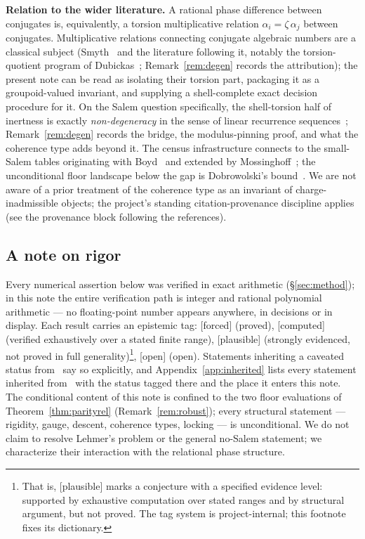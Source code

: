 \documentclass[11pt]{article}
\theoremstyle{plain}
\theoremstyle{definition}
\theoremstyle{remark}
\newcommand{\F}{\textnormal{[forced]}}
\newcommand{\C}{\textnormal{[computed]}}
\newcommand{\Pl}{\textnormal{[plausible]}}
\newcommand{\Op}{\textnormal{[open]}}
\begin{document}
\medskip
\noindent\textbf{Relation to the wider literature.} A rational phase
difference between conjugates is, equivalently, a torsion multiplicative
relation $\alpha_i=\zeta\,\alpha_j$ between conjugates. Multiplicative
relations connecting conjugate algebraic numbers are a classical subject
(Smyth~\cite{Smyth1986} and the literature following it, notably the
torsion-quotient program of Dubickas~\cite{Dub2012, Dub2017, Dub2021};
Remark~\ref{rem:degen} records the attribution); the present note
can be read as isolating their torsion part, packaging it as a
groupoid-valued invariant, and supplying a shell-complete exact decision
procedure for it. On the Salem question specifically, the shell-torsion
half of inertness is exactly \emph{non-degeneracy} in the sense of linear
recurrence sequences~\cite{EPSW}; Remark~\ref{rem:degen} records the
bridge, the modulus-pinning proof, and what the coherence type adds beyond
it. The census infrastructure connects to the small-Salem
tables originating with Boyd~\cite{Boyd1977} and extended by
Mossinghoff~\cite{Mossinghoff}; the unconditional floor landscape below the
gap is Dobrowolski's bound~\cite{Dobrowolski}. We are not aware of a prior
treatment of the coherence type as an invariant of charge-inadmissible
objects; the project's standing citation-provenance discipline applies (see
the provenance block following the references).

\subsection{A note on rigor}

Every numerical assertion below was verified in exact arithmetic
(\S\ref{sec:method}); in this note the entire verification path is integer and
rational polynomial arithmetic --- no floating-point number appears anywhere, in
decisions or in display. Each result carries an epistemic tag: \F{} (proved),
\C{} (verified exhaustively over a stated finite range), \Pl{} (strongly
evidenced, not proved in full generality)\footnote{That is, \Pl{} marks a
conjecture with a specified evidence level: supported by exhaustive
computation over stated ranges and by structural argument, but not proved.
The tag system is project-internal; this footnote fixes its dictionary.}, \Op{} (open). Statements inheriting a
caveated status from~\cite{CMC} say so explicitly, and
Appendix~\ref{app:inherited} lists every statement inherited
from~\cite{CMC} with the status tagged there and the place it enters this
note. The conditional content of this note is confined to the two floor
evaluations of Theorem~\ref{thm:parityrel} (Remark~\ref{rem:robust});
every structural statement --- rigidity, gauge, descent, coherence types,
locking --- is unconditional. We do not claim to resolve
Lehmer's problem or the general no-Salem statement; we characterize their
interaction with the relational phase structure.
\end{document}
